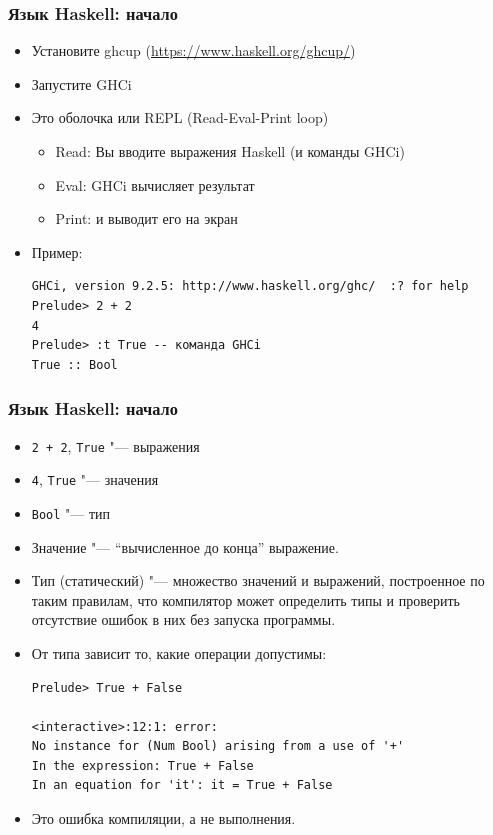 \documentclass[10pt]{beamer}
\begin{document}
\begin{frame}[fragile]
\frametitle{Язык Haskell: начало}
\begin{itemize}
    \item Установите ghcup (\url{https://www.haskell.org/ghcup/})
    \item Запустите GHCi
    \item Это оболочка или REPL (Read-Eval-Print loop)
    \begin{itemize}
        \item Read: Вы вводите выражения Haskell (и команды GHCi)
        \item Eval: GHCi вычисляет результат
        \item Print: и выводит его на экран
    \end{itemize}
    \item Пример:
\begin{lstlisting}[breaklines]
GHCi, version 9.2.5: http://www.haskell.org/ghc/  :? for help
Prelude> 2 + 2
4
Prelude> :t True -- команда GHCi
True :: Bool
\end{lstlisting}
\end{itemize}
\end{frame}

\begin{frame}[fragile]
\frametitle{Язык Haskell: начало}
\begin{itemize}
    \item \lstinline|2 + 2|, \lstinline|True| "--- выражения
    \item \lstinline|4|, \lstinline|True| "--- значения
    \item \lstinline|Bool| "--- тип
    \pause
    \item Значение "--- \enquote{вычисленное до конца} выражение.
    \item Тип (статический) "--- множество значений и выражений, построенное по таким правилам, что компилятор может определить типы и проверить отсутствие ошибок в них без запуска программы.
    \item От типа зависит то, какие операции допустимы:
\begin{lstlisting}[basicstyle=\ttfamily\small]
Prelude> True + False

<interactive>:12:1: error:
No instance for (Num Bool) arising from a use of '+'
In the expression: True + False
In an equation for 'it': it = True + False
\end{lstlisting}
\item Это ошибка компиляции, а не выполнения.
\end{itemize}
\end{frame}
\end{document}
